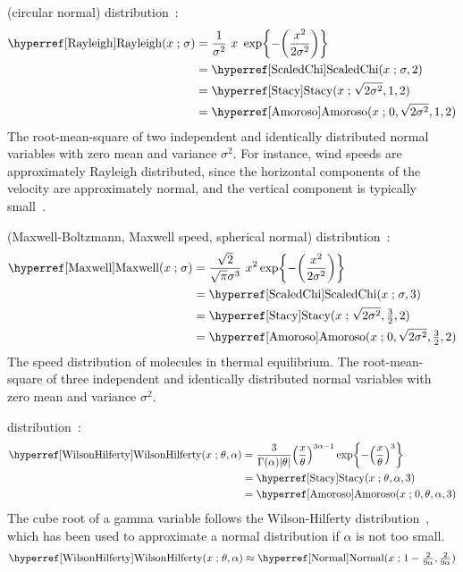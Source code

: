  (circular normal) distribution~\cite{Strutt1880,Johnson1994}:
%
\begin{align}
\label{Rayleigh}
\opr{Rayleigh}(x \given \sigma) 
&= \frac{1}{\sigma^2 }\ x\  \exp\Left\{-\Left(\frac{x^2}{2 \sigma^2}\Right)\Right\}  \checked
\\
&=\opr{ScaledChi}(x \given \sigma, 2) \notag 							\checked \\
&=  \opr{Stacy}(x\given  \sqrt{2\sigma^2} ,1,2) \notag					\checked \\
&=  \opr{Amoroso}(x\given  0, \sqrt{2\sigma^2} , 1, 2) 					\checked \notag 
\end{align}
 The root-mean-square of two independent and identically distributed normal variables with zero mean and variance $\sigma^2$. 
 For instance, wind speeds are approximately Rayleigh distributed, since the horizontal components of the velocity are approximately normal, and the vertical component is typically small~\cite{Justus1978}. 


 (Maxwell-Boltzmann, Maxwell speed, spherical normal) distribution~\cite{Maxwell1860, Abramowitz1965}:
%
\begin{align}
\label{Maxwell}
\opr{Maxwell}(x \given \sigma) 
&= \frac{\sqrt{2}}{\sqrt{\pi} \sigma^3}\ x^2 \exp\Left\{-\Left(\frac{x^2}{2\sigma^2}\Right)\Right\}  \checked
 \\
&=\opr{ScaledChi}(x \given \sigma, 3) \checked \notag \\
&=  \opr{Stacy}(x\given  \sqrt{2\sigma^2} ,\tfrac{3}{2},2) \notag  \checked\\
&=  \opr{Amoroso}(x\given  0, \sqrt{2\sigma^2} , \tfrac{3}{2}, 2) \notag  \checked
\end{align}
The speed distribution of molecules in thermal equilibrium. The root-mean-square of three independent and identically distributed normal variables with zero mean and variance $\sigma^2$.



 distribution~\cite{Wilson1931,Johnson1994}:
\begin{align}
\label{WilsonHilferty}
\opr{WilsonHilferty}(x \given \theta, \alpha) 
&= \frac{3}{\Gamma(\alpha)|\theta|} \Left(\frac{x}{\theta}\Right)^{3 \alpha-1} \exp\Left\{-\Left(\frac{x}{\theta}\Right)^{3}\Right\}
\checked
\\ 
&=  \opr{Stacy}(x\given \theta, \alpha, 3) \checked
\notag 
\\ &=  \opr{Amoroso}(x\given  0, \theta, \alpha, 3) \checked
\notag
\end{align}
The cube root of a gamma variable follows the Wilson-Hilferty distribution~\cite{Wilson1931}, which has been used to approximate a normal distribution if $\alpha$ is not too small.
\[
\opr{WilsonHilferty}(x \given \theta, \alpha)  \approx \opr{Normal}(x \given 1-\sfrac{2}{9\alpha},  \sfrac{2}{9\alpha} )
\checked
\notag
\]


